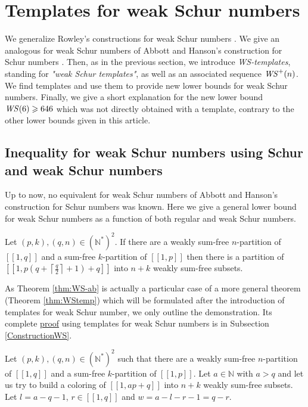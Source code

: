 \section{Templates for weak Schur numbers}
\label{WeakSchur}

We generalize Rowley's constructions for weak Schur numbers \cite{RowleyWS}. We give an analogous for weak Schur numbers of Abbott 
and Hanson's construction for Schur numbers \cite{AbbottHanson}. Then, as in the previous section, we introduce \textit{WS-templates}, 
standing for \textit{"weak Schur templates"}, as well as an associated sequence \(\mathit{WS}^+(n)\). We find templates and use them to provide 
new lower bounds for weak Schur numbers. Finally, we give a short explanation for the new lower bound \(\mathit{WS}(6) \geqslant 646\) which 
was not directly obtained with a template, contrary to the other lower bounds given in this article.

\subsection{Inequality for weak Schur numbers using Schur and weak Schur numbers}

Up to now, no equivalent for weak Schur numbers of Abbott and Hanson's construction for Schur numbers
\cite{AbbottHanson} was known. Here we give a general lower bound for weak Schur numbers as a function of both
regular and weak Schur numbers.

\begin{theorem}
\label{thm:WS-ab}
\begin{sloppypar}
Let \((p,k), (q,n) \in (\mathbb{N}^*)^2\). If there are a weakly sum-free \(n\)-partition of \([\![1,q]\!]\)
and a sum-free \(k\)-partition of \([\![1,p]\!]\) then there is a partition of
\({[\![1,p(q+\left \lceil \frac{q}{2} \right \rceil + 1)+q]\!]}\) into \(n+k\) weakly sum-free subsets.
\end{sloppypar}
\end{theorem}

As Theorem \ref{thm:WS-ab} is actually a particular case of a more general theorem (Theorem \ref{thm:WStemp}) which will
be formulated after the introduction of templates for weak Schur number,
we only outline the demonstration. Its complete \hyperref[PreuveThm]{proof} using templates 
for weak Schur numbers is in Subsection \ref{ConstructionWS}.

Let \((p, k), (q, n) \in (\mathbb{N}^*)^2\) such that there are a weakly sum-free \(n\)-partition of \([\![1,q]\!]\) 
and a sum-free \(k\)-partition of \([\![1,p]\!]\). Let \(a \in \mathbb{N}\) with \(a > q\)
and let us try to build a coloring of \([\![1, ap + q]\!]\) into \(n + k\) weakly sum-free subsets. Let
\(l = a - q - 1\), \(r \in [\![1,q]\!]\) and \(w = a - l - r - 1 = q - r\).

